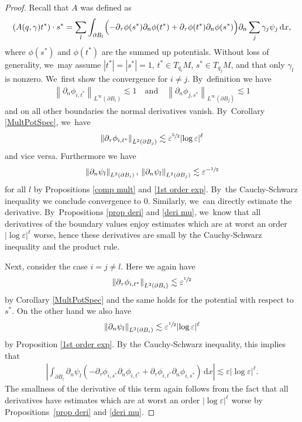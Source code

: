 \documentclass[JEP,XML,SOM,Unicode,published]{cedram}
\let\epsilon\varepsilon
\theoremstyle{definition}
\newcommand\norm[1]{\left\lVert #1\right\rVert}
\newcommand\eq{=}
\newcommand\dd{\,\mathrm{d}}
\newcommand\dx{\dd x}
\let\de\partial
\let\eps\epsilon
\begin{document}
\begin{proof} Recall that $A$ was defined as
\begin{align*}
(A(q,\gamma)t^*)\cdot s^*\eq\sum_l\int_{\de B_l}\Bigl(-\de_\tau\phi(s^*)\de_n\phi(t^*)+\de_\tau\phi(t^*)\de_n\phi(s^*)\Bigr)\de_n\sum_j\gamma_j\psi_j\dx,
\end{align*}
where $\phi(s^*)$ and $\phi(t^*)$ are the summed up potentials.
Without loss of generality, we~may assume $|t^*|=|s^*|=1$, $t^*\in T_{q_i}M$, $s^*\in T_{q_j}M$, and that only $\gamma_l$ is nonzero. We~first show the convergence for $i\neq j$. By~definition we have
\begin{align*}
\norm{\de_n\phi_{i,t^*}}_{L^\infty(\de B_i)}\lesssim 1\quad\text{and}\quad \norm{\de_n\phi_{j,s^*}}_{L^\infty(\de B_j)}\lesssim 1
\end{align*}
and on all other boundaries the normal derivatives vanish. By~Corollary \ref{MultPotSpec}, we~have
\begin{align*}
\norm{\de_\tau\phi_{i,t^*}}_{L^2(\de B_j)}\lesssim \eps^{\sfrac{5}{2}}|{\log\eps}|^\ell
\end{align*}
and vice versa. Furthermore we have
\begin{align*}
\norm{\de_n\psi_l}_{L^2(\de B_i)},\,\norm{\de_n\psi_l}_{L^2(\de B_j)}\lesssim \eps^{-\sfrac{1}{2}}
\end{align*}
for all $l$ by Propositions \ref{comp mult} and \ref{1st order exp}. By~the Cauchy-Schwarz inequality we conclude convergence to $0$. Similarly, we~can directly estimate the derivative. By~Propositions \ref{prop deri} and \ref{deri mu}, we~know that all derivatives of the boundary values enjoy estimates which are at worst an order $|{\log\eps}|^\ell$ worse, hence these derivatives are small by the Cauchy-Schwarz inequality and the product rule.

Next, consider the case $i=j\neq l$. Here we again have
\begin{align*}
\norm{\de_\tau\phi_{i,t^*}}_{L^2(\de B_i)}\lesssim \eps^{\sfrac{1}{2}}
\end{align*}
by Corollary \ref{MultPotSpec} and the same holds for the potential with respect to $s^*$. On the other hand we also have
\begin{align*}
\norm{\de_n\psi_l}_{L^2(\de B_i)}\lesssim \eps^{\sfrac{1}{2}}|{\log\eps}|^\ell
\end{align*}
by Proposition \ref{1st order exp}.
By the Cauchy-Schwarz inequality, this implies that
\begin{align*}
\left|\int_{\de B_i}\de_n\psi_l\left(-\de_\tau\phi_{i,s^*}\de_n\phi_{i,t^*}+\de_\tau\phi_{i,t^*}\de_n\phi_{i,s^*}\right)\dx\right|\lesssim \eps|{\log\eps}|^\ell.
\end{align*}
The smallness of the derivative of this term again follows from the fact that all derivatives have estimates which are at worst an order $|{\log\eps}|^\ell$ worse by Propositions~\ref{prop deri} and \ref{deri mu}.


\end{proof}
\end{document}
